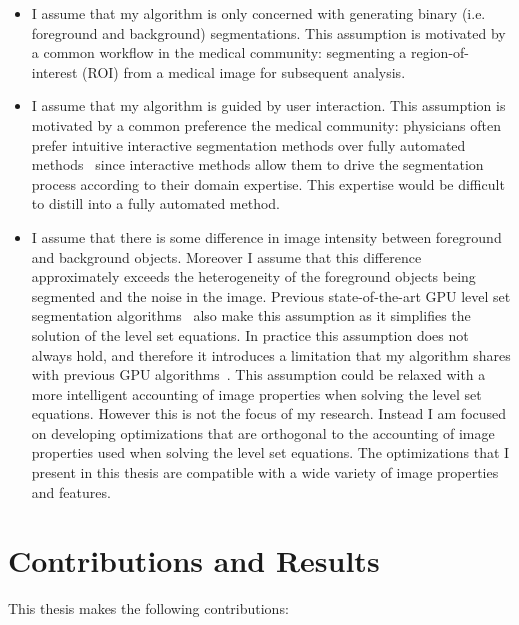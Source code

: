 \begin{itemize}

    \item I assume that my algorithm is only concerned with generating binary (i.e. foreground and background) segmentations. This assumption is motivated by a common workflow in the medical community: segmenting a region-of-interest (ROI) from a medical image for subsequent analysis.

    \item I assume that my algorithm is guided by user interaction. This assumption is motivated by a common preference the medical community: physicians often prefer intuitive interactive segmentation methods over fully automated methods~\cite{Unger-2008} since interactive methods allow them to drive the segmentation process according to their domain expertise. This expertise would be difficult to distill into a fully automated method.

    \item I assume that there is some difference in image intensity between foreground and background objects. Moreover I assume that this difference approximately exceeds the heterogeneity of the foreground objects being segmented and the noise in the image. Previous state-of-the-art GPU level set segmentation algorithms~\cite{Lefohn-2003-Vis,Lefohn-2003-MICCAI,Lefohn-2004,Cates-2004,Jeong-2009} also make this assumption as it simplifies the solution of the level set equations. In practice this assumption does not always hold, and therefore it introduces a limitation that my algorithm shares with previous GPU algorithms~\cite{Lefohn-2003-Vis,Lefohn-2003-MICCAI,Lefohn-2004,Cates-2004,Jeong-2009}. This assumption could be relaxed with a more intelligent accounting of image properties when solving the level set equations. However this is not the focus of my research. Instead I am focused on developing optimizations that are orthogonal to the accounting of image properties used when solving the level set equations. The optimizations that I present in this thesis are compatible with a wide variety of image properties and features. 
\end{itemize}

\section{Contributions and Results}

This thesis makes the following contributions:

